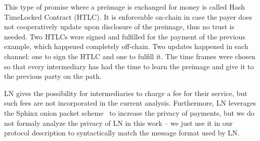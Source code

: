     This type of promise where a preimage is exchanged for money is called Hash
    TimeLocked Contract (HTLC). It is enforceable on-chain in case the payer
    does not cooperatively update upon disclosure of the preimage, thus no trust
    is needed. Two HTLCs were signed and fulfilled for the payment of the
    previous example, which happened completely off-chain. Two updates happened
    in each channel: one to sign the HTLC and one to fulfill it. The time frames
    were chosen so that every intermediary has had the time to learn the
    preimage and give it to the previous party on the path.

    LN gives the possibility for intermediaries to charge a fee for their
    service, but such fees are not incorporated in the current analysis.
    Furthermore, LN leverages the Sphinx onion packet scheme~\cite{sphinx} to
    increase the privacy of payments, but we do not formaly analyze the privacy
    of LN in this work -- we just use it in our protocol description to
    syntactically match the message format used by LN.
